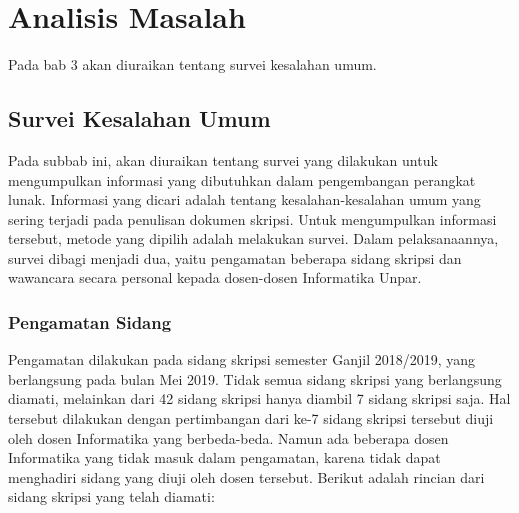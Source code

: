 \chapter{Analisis Masalah}
\label{chap:analisis}

Pada bab 3 akan diuraikan tentang survei kesalahan umum.

\section{Survei Kesalahan Umum}
\label{sec:survei}
Pada subbab ini, akan diuraikan tentang survei yang dilakukan untuk mengumpulkan informasi yang dibutuhkan dalam pengembangan perangkat lunak. Informasi yang dicari adalah tentang kesalahan-kesalahan umum yang sering terjadi pada penulisan dokumen skripsi. Untuk mengumpulkan informasi tersebut, metode yang dipilih adalah melakukan survei. Dalam pelaksanaannya, survei dibagi menjadi dua, yaitu pengamatan beberapa sidang skripsi dan wawancara secara personal kepada dosen-dosen Informatika Unpar. 

\subsection{Pengamatan Sidang}
Pengamatan dilakukan pada sidang skripsi semester Ganjil 2018/2019, yang berlangsung pada bulan Mei 2019. Tidak semua sidang skripsi yang berlangsung diamati, melainkan dari 42 sidang skripsi hanya diambil 7 sidang skripsi saja. Hal tersebut dilakukan dengan pertimbangan dari ke-7 sidang skripsi tersebut diuji oleh dosen Informatika yang berbeda-beda. Namun ada beberapa dosen Informatika yang tidak masuk dalam pengamatan, karena tidak dapat menghadiri sidang yang diuji oleh dosen tersebut. Berikut adalah rincian dari sidang skripsi yang telah diamati:

